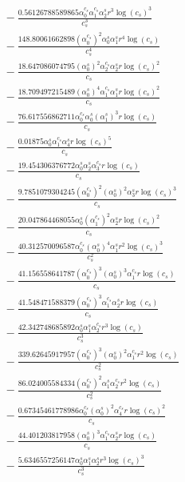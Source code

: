 \documentclass[10pt]{article}
\begin{document}
\begin{align*}
&{}  - \frac{0.56126788589865 \alpha_{0}^{c_s} \alpha_{1}^{c_s} \alpha_{2}^s r^{3} \log{\left(c_{s} \right)}^{3}}{c_{s}^{3}} \\
&{}  - \frac{148.80061662898 \left(\alpha_{0}^{c_s}\right)^{2} \alpha_{0}^s \alpha_{1}^s r^{4} \log{\left(c_{s} \right)}}{c_{s}^{4}} \\
&{}  - \frac{18.647086074795 \left(\alpha_{0}^s\right)^{2} \alpha_{2}^{c_s} \alpha_{2}^s r \log{\left(c_{s} \right)}^{2}}{c_{s}} \\
&{}  - \frac{18.709497215489 \left(\alpha_{0}^s\right)^{4} \alpha_{1}^{c_s} \alpha_{1}^s r \log{\left(c_{s} \right)}^{2}}{c_{s}} \\
&{}  - \frac{76.617556862711 \alpha_{0}^{c_s} \alpha_{0}^s \left(\alpha_{1}^s\right)^{3} r \log{\left(c_{s} \right)}}{c_{s}} \\
&{}  - \frac{0.01875 \alpha_{0}^s \alpha_{1}^{c_s} \alpha_{4}^s r \log{\left(c_{s} \right)}^{5}}{c_{s}} \\
&{}  - \frac{19.454306376772 \alpha_{0}^s \alpha_{2}^s \alpha_{3}^{c_s} r \log{\left(c_{s} \right)}}{c_{s}} \\
&{}  - \frac{9.7851079304245 \left(\alpha_{0}^{c_s}\right)^{2} \left(\alpha_{0}^s\right)^{2} \alpha_{3}^s r \log{\left(c_{s} \right)}^{3}}{c_{s}} \\
&{}  - \frac{20.047864468055 \alpha_{0}^s \left(\alpha_{1}^{c_s}\right)^{2} \alpha_{2}^s r \log{\left(c_{s} \right)}^{2}}{c_{s}} \\
&{}  - \frac{40.312570096587 \alpha_{0}^{c_s} \left(\alpha_{0}^s\right)^{4} \alpha_{1}^s r^{2} \log{\left(c_{s} \right)}^{3}}{c_{s}^{2}} \\
&{}  - \frac{41.156558641787 \left(\alpha_{0}^{c_s}\right)^{3} \left(\alpha_{0}^s\right)^{3} \alpha_{1}^{c_s} r \log{\left(c_{s} \right)}}{c_{s}} \\
&{}  - \frac{41.548471588379 \left(\alpha_{0}^{c_s}\right)^{3} \alpha_{1}^{c_s} \alpha_{2}^s r \log{\left(c_{s} \right)}}{c_{s}} \\
&{}  - \frac{42.342748685892 \alpha_{0}^s \alpha_{1}^s \alpha_{2}^{c_s} r^{3} \log{\left(c_{s} \right)}}{c_{s}^{3}} \\
&{}  - \frac{339.62645917957 \left(\alpha_{0}^{c_s}\right)^{3} \left(\alpha_{0}^s\right)^{2} \alpha_{1}^{c_s} r^{2} \log{\left(c_{s} \right)}}{c_{s}^{2}} \\
&{}  - \frac{86.024005584334 \left(\alpha_{0}^{c_s}\right)^{2} \alpha_{1}^s \alpha_{2}^{c_s} r^{2} \log{\left(c_{s} \right)}}{c_{s}^{2}} \\
&{}  - \frac{0.67345461778986 \alpha_{0}^{c_s} \left(\alpha_{0}^s\right)^{2} \alpha_{4}^{c_s} r \log{\left(c_{s} \right)}^{2}}{c_{s}} \\
&{}  - \frac{44.401203817958 \left(\alpha_{0}^s\right)^{3} \alpha_{1}^{c_s} \alpha_{2}^s r \log{\left(c_{s} \right)}}{c_{s}} \\
&{}  - \frac{5.6346557256147 \alpha_{0}^s \alpha_{1}^s \alpha_{2}^s r^{3} \log{\left(c_{s} \right)}^{3}}{c_{s}^{3}}
\end{align*}
\end{document}
